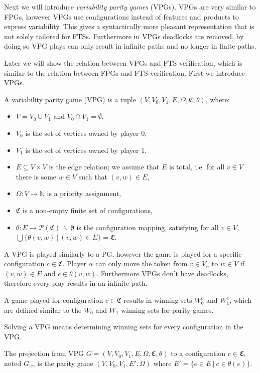 Next we will introduce \textit{variability parity games} (VPGs). VPGs are very similar to FPGs, however VPGs use configurations instead of features and products to express variability. This gives a syntactically more pleasant representation that is not solely tailored for FTSs. Furthermore in VPGs deadlocks are removed, by doing so VPG plays can only result in infinite paths and no longer in finite paths.

Later we will show the relation between VPGs and FTS verification, which is similar to the relation between FPGs and FTS verification. First we introduce VPGs.
\begin{definition}
\label{def_VPG}
A variability parity game (VPG) is a tuple $(V,V_0, V_1, E, \Omega, \mathfrak{C}, \theta)$, where:
\begin{itemize}
	\item $V = V_0 \cup V_1$ and $V_0 \cap V_1 = \emptyset$,
	\item $V_0$ is the set of vertices owned by player $0$,
	\item $V_1$ is the set of vertices owned by player $1$, 
	\item $E \subseteq V \times V$ is the edge relation; we assume that $E$ is total, i.e. for all $v\in V$ there is some $w \in V$ such that $(v,w) \in E$,
	\item $\Omega :  V \rightarrow \mathbb{N}$ is a priority assignment,
	\item $\mathfrak{C}$ is a non-empty finite set of configurations,
	\item $\theta : E \rightarrow \mathcal{P}(\mathfrak{C})\ \backslash\ \emptyset$ is the configuration mapping, satisfying for all $v \in V$, $\bigcup\{\theta(v,w)\ |\ (v,w) \in E\} = \mathfrak{C}$.
\end{itemize}
\end{definition}
A VPG is played similarly to a PG, however the game is played for a specific configuration $c \in \mathfrak{C}$. Player $\alpha$ can only move the token from $v \in V_\alpha$ to $w \in V$ if $(v,w) \in E$ and $c \in \theta(v,w)$. Furthermore VPGs don't have deadlocks, therefore every play results in an infinite path.

A game played for configuration $c \in \mathfrak{C}$ results in winning sets $W_0^c$ and $W_1^c$, which are defined similar to the $W_0$ and $W_1$ winning sets for parity games.

Solving a VPG means determining winning sets for every configuration in the VPG.
\begin{definition}
\label{def_VPG_proj} The projection from VPG $G = (V, V_0, V_1, E, \Omega, \mathfrak{C}, \theta)$ to a configuration $c \in \mathfrak{C}$, noted $G_{|c}$, is the parity game $(V, V_0, V_1, E', \Omega)$ where $E' = \{ e\in E\ |\ c \in \theta(e)\}$.
\end{definition}

